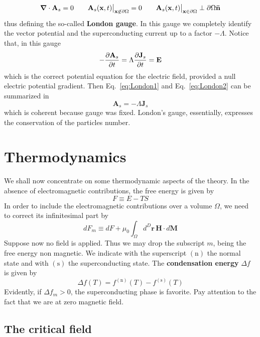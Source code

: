 \begin{equation}\label{eq:LondonGauge}
    \grad\cdot\mathbf{A}_s = 0
    \qquad
    \mathbf{A}_s(\mathbf{x},t) \big|_{\mathbf{x}\not\in\partial\Omega} = 0
    \qquad
    \mathbf{A}_s(\mathbf{x},t) \big|_{\mathbf{x}\in\partial\Omega} \perp \partial\Omega \mathbf{\bar{n}}
\end{equation}
thus defining the so-called \textbf{London gauge}. In this gauge we completely identify the vector potential and the superconducting current up to a factor $-\Lambda$. Notice that, in this gauge
\[
    - \pdv{\mathbf{A}_s}{t} = \Lambda \pdv{\mathbf{J}_s}{t} = \mathbf{E}
\]
which is the correct potential equation for the electric field, provided a null electric potential gradient. Then Eq.~\eqref{eq:London1} and Eq.~\eqref{eq:London2} can be summarized in
\begin{equation}\label{eq:LondonPotential}
    \mathbf{A}_s = - \Lambda \mathbf{J}_s
\end{equation}
which is coherent because gauge was fixed. London's gauge, essentially, expresses the conservation of the particles number.

\section{Thermodynamics}
We shall now concentrate on some thermodynamic aspects of the theory. In the absence of electromagnetic contributions, the free energy is given by
\[
    F \equiv E - TS
\]
In order to include the electromagnetic contributions over a volume $\Omega$, we need to correct its infinitesimal part by
\[
    dF_m \equiv dF + \mu_0 \int_{\Omega} d^D \mathbf{r} \, \mathbf{H} \cdot d\mathbf{M}
\]
Suppose now no field is applied. Thus we may drop the subscript $m$, being the free energy non magnetic. We indicate with the superscript $(\mathrm{n})$ the normal state and with $(\mathrm{s})$ the superconducting state. The \textbf{condensation energy} $\Delta f$ is given by
\[
    \Delta f (T) = f^{(\mathrm{n})}(T) - f^{(\mathrm{s})}(T)
\]
Evidently, if $\Delta f_m > 0$, the superconducting phase is favorite. Pay attention to the fact that we are at zero magnetic field.

\subsection{The critical field}\label{sec:the critical field}

